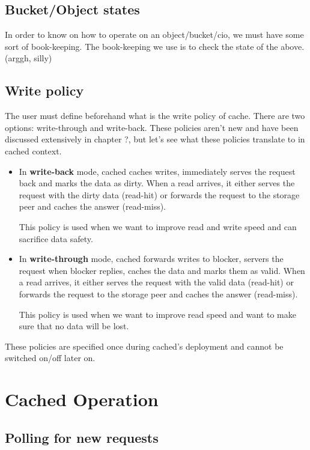 \subsection{Bucket/Object states}

In order to know on how to operate on an object/bucket/cio, we must have some 
sort of book-keeping. The book-keeping we use is to check the state of the 
above. (arggh, silly)

\subsection{Write policy}\label{sec:wcp-design}

The user must define beforehand what is the write policy of cache. There are
two options: write-through and write-back. These policies aren't new and have 
been discussed extensively in chapter ?, but let's see what these policies 
translate to in cached context.

\begin{itemize}
	\item
		In \textbf{write-back} mode, cached caches writes, immediately 
		serves the request back and marks the data as dirty. When a read 
		arrives, it either serves the request with the dirty data 
		(read-hit) or forwards the request to the storage peer and 
		caches the answer (read-miss).

		This policy is used when we want to improve read and write speed 
		and can sacrifice data safety.
	\item
		In \textbf{write-through} mode, cached forwards writes to 
		blocker, servers the request when blocker replies, caches the 
		data and marks them as valid.  When a read arrives, it either 
		serves the request with the valid data (read-hit) or forwards 
		the request to the storage peer and caches the answer 
		(read-miss).

		This policy is used when we want to improve read speed and want 
		to make sure that no data will be lost.
\end{itemize}	

These policies are specified once during cached's deployment and cannot be 
switched on/off later on.

\section{Cached Operation}\label{sec:op-design}

\subsection{Polling for new requests}

